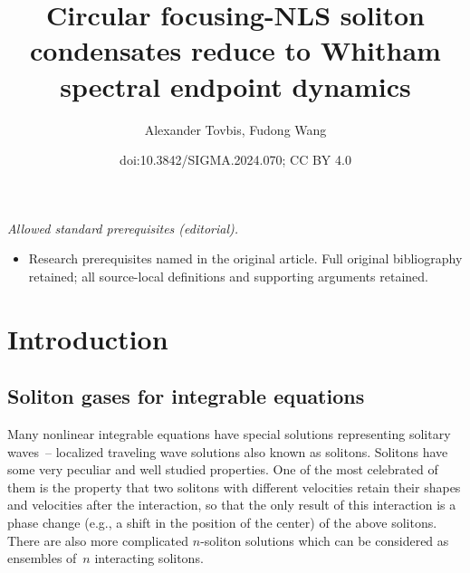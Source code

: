 \documentclass[10pt,a4paper]{amsart}
\title{Circular focusing-NLS soliton condensates reduce to Whitham spectral endpoint dynamics}
\author{Alexander Tovbis, Fudong Wang}
\date{doi:10.3842/SIGMA.2024.070; CC BY 4.0}
\numberwithin{equation}{section}
\begin{document}
\maketitle
\noindent\textit{Allowed standard prerequisites (editorial).}\begin{itemize}
\item Research prerequisites named in the original article. Full original bibliography retained; all source-local definitions and supporting arguments retained.
\end{itemize}\medskip
\section{Introduction}


\subsection{Soliton gases for integrable equations}
Many nonlinear integrable equations have special solutions representing solitary waves~--
localized traveling wave solutions also known as solitons. Solitons have some very peculiar and well studied properties. One of the most celebrated of them is the property that two solitons with different velocities retain their shapes and velocities after the interaction, so that the only result of this interaction is a phase change (e.g., a shift in the position of the center) of the above solitons. There are also more complicated $n$-soliton solutions which can be considered as ensembles of~$n$ interacting solitons.
\end{document}
